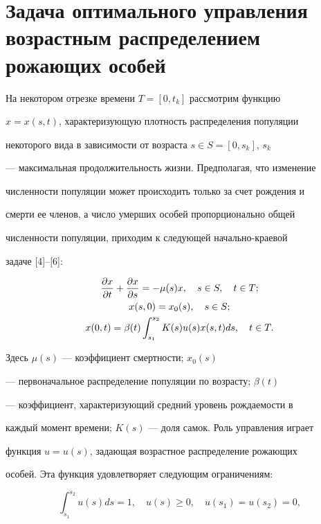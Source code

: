 \section{Задача оптимального управления возрастным распределением\protect\\


рожающих особей}





На некотором отрезке времени $T=[0,t_k]$ рассмотрим функцию


$x=x(s,t)$, характеризующую плотность распределения популяции


некоторого вида в зависимости от возраста $s \in S=[0,s_k]$, $s_k$


--- максимальная продолжительность жизни. Предполагая, что изменение


численности популяции может происходить только за счет рождения и


смерти ее членов, а число умерших особей пропорционально общей


численности популяции, приходим к следующей начально-краевой


задаче [4]--[6]:


\begin{gather}


\frac{\partial x}{\partial t} + \frac{\partial


x}{\partial s} = -\mu (s) x, \quad s\in S, \quad t\in T;\notag \\


x(s,0)=x_0(s), \quad s\in S;\\


x(0,t)=\beta(t) \int_{s_1}^{s_2} K(s) u(s) x(s,t)ds,


\quad t\in T.\notag


\end{gather}


Здесь $\mu(s)$ --- коэффициент смертности; $x_0 (s)$


--- первоначальное распределение популяции по возрасту; $\beta (t)$


--- коэффициент, характеризующий средний уровень рождаемости в


каждый момент времени; $K(s)$ --- доля самок. Роль управления играет


функция $u=u(s)$, задающая возрастное распределение рожающих


особей. Эта функция удовлетворяет следующим ограничениям:


\begin{equation}


\int_{s_1}^{s_2} u(s) ds = 1, \quad u(s) \geq 0, \quad


u(s_1)=u(s_2)=0,


\end{equation}


